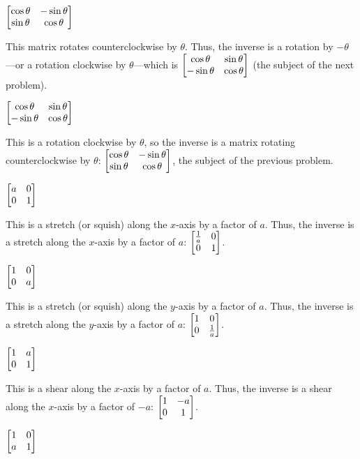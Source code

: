 \documentclass[../gatm_answers.tex]{subfiles}
\begin{document}
\begin{inner_problem}
\item $\begin{bmatrix} \cos\theta & -\sin\theta \\ \sin\theta & \cos\theta \end{bmatrix}$
\end{inner_problem}

This matrix rotates counterclockwise by $\theta$. Thus, the inverse is a rotation by $-\theta$---or a rotation clockwise by $\theta$---which is $\begin{bmatrix} \cos\theta & \sin\theta \\ -\sin\theta & \cos\theta \end{bmatrix}$ (the subject of the next problem).

\begin{inner_problem}
\item $\begin{bmatrix} \cos\theta & \sin\theta \\ -\sin\theta & \cos\theta \end{bmatrix}$
\end{inner_problem}

This is a rotation clockwise by $\theta$, so the inverse is a matrix rotating counterclockwise by $\theta$: $\begin{bmatrix} \cos\theta & -\sin\theta \\ \sin\theta & \cos\theta \end{bmatrix}$, the subject of the previous problem.

\begin{inner_problem}
\item $\begin{bmatrix} a & 0 \\ 0 & 1 \end{bmatrix}$
\end{inner_problem}

This is a stretch (or squish) along the $x$-axis by a factor of $a$. Thus, the inverse is a stretch along the $x$-axis by a factor of $a$: $\begin{bmatrix} \frac{1}{a} & 0 \\ 0 & 1 \end{bmatrix}$.

\begin{inner_problem}
\item $\begin{bmatrix} 1 & 0 \\ 0 & a \end{bmatrix}$
\end{inner_problem}

This is a stretch (or squish) along the $y$-axis by a factor of $a$. Thus, the inverse is a stretch along the $y$-axis by a factor of $a$: $\begin{bmatrix} 1 & 0 \\ 0 & \frac{1}{a} \end{bmatrix}$.

\begin{inner_problem}
\item $\begin{bmatrix} 1 & a \\ 0 & 1 \end{bmatrix}$
\end{inner_problem}

This is a shear along the $x$-axis by a factor of $a$. Thus, the inverse is a shear along the $x$-axis by a factor of $-a$: $\begin{bmatrix} 1 & -a \\ 0 & 1 \end{bmatrix}$.

\begin{inner_problem}
\item $\begin{bmatrix} 1 & 0 \\ a & 1 \end{bmatrix}$
\end{inner_problem}
\end{document}
